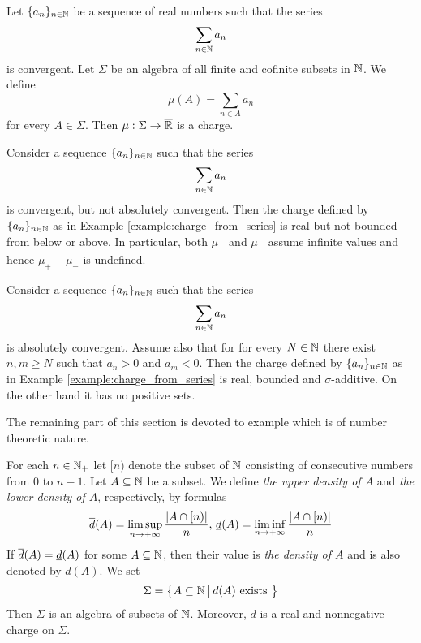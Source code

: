 \begin{example}\label{example:charge_from_series}
    Let $\{a_n\}_{n\in {\mathbb N}}$ be a sequence of real numbers such that the series
    $$\sum_{n\in {\mathbb N}}a_n$$
    is convergent. Let $\Sigma$ be an algebra of all finite and cofinite subsets in ${\mathbb N}$. We define
    $$\mu(A) = \sum_{n \in A} a_n$$
    for every $A \in \Sigma$. Then $\mu:\Sigma \rightarrow \overline{{\mathbb R}}$ is a charge.
\end{example}

\begin{remark}\label{remark:unbounded_charge_from_not_absolutely_convergent_series}
    Consider a sequence $\{a_n\}_{n\in {\mathbb N}}$ such that the series
    $$\sum_{n\in {\mathbb N}}a_n$$
    is convergent, but not absolutely convergent. Then the charge defined by $\{a_n\}_{n\in {\mathbb N}}$ as in Example \ref{example:charge_from_series} is real but not bounded from below or above. In particular, both $\mu_+$ and $\mu_-$ assume infinite values and hence $\mu_+ - \mu_-$ is undefined.
\end{remark}

\begin{remark}\label{remark:one_sided_bounded_charge_without_positive_set}
    Consider a sequence $\{a_n\}_{n\in {\mathbb N}}$ such that the series
    $$\sum_{n\in {\mathbb N}}a_n$$
    is absolutely convergent. Assume also that for for every $N \in {\mathbb N}$ there exist $n,m\geq N$ such that $a_n > 0$ and $a_m < 0$. Then the charge defined by $\{a_n\}_{n\in {\mathbb N}}$ as in Example \ref{example:charge_from_series} is real, bounded and $\sigma$-additive. On the other hand it has no positive sets.
\end{remark}
\noindent
The remaining part of this section is devoted to example which is of number theoretic nature.

\begin{example}\label{example:natural_density_charge}
    For each $n \in {\mathbb N}_+$ let $[n)$ denote the subset of ${\mathbb N}$ consisting of consecutive numbers from $0$ to $n-1$. Let $A \subseteq {\mathbb N}$ be a subset. We define \textit{the upper density of $A$} and \textit{the lower density of $A$}, respectively, by formulas
    $$\overline{d}(A) = \limsup_{n\rightarrow +\infty}\frac{|A\cap [n)|}{n},\,\underline{d}(A) = \liminf_{n\rightarrow +\infty}\frac{|A\cap [n)|}{n}$$
    If $\overline{d}(A) = \underline{d}(A)$ for some $A \subseteq {\mathbb N}$, then their value is \textit{the density of $A$} and is also denoted by $d(A)$. We set
    $$\Sigma = \big\{A\subseteq {\mathbb N}\,\big|\,d(A)\mbox{ exists }\big\}$$
    Then $\Sigma$ is an algebra of subsets of ${\mathbb N}$. Moreover, $d$ is a real and nonnegative charge on $\Sigma$.
\end{example}

